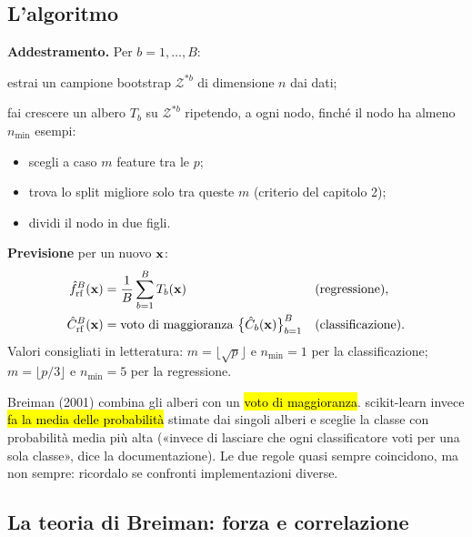 \subsection{L'algoritmo}

\begin{tecnica}
\textbf{Addestramento.} Per $b=1,\dots,B$:
\begin{passi}
  \item estrai un campione bootstrap $\mathcal{Z}^{*b}$ di dimensione $n$ dai dati;
  \item fai crescere un albero $T_b$ su $\mathcal{Z}^{*b}$ ripetendo, a ogni nodo, finché il nodo ha almeno $n_{\min}$ esempi:
    \begin{itemize}
      \item scegli a caso $m$ feature tra le $p$;
      \item trova lo split migliore solo tra queste $m$ (criterio del capitolo 2);
      \item dividi il nodo in due figli.
    \end{itemize}
\end{passi}
\textbf{Previsione} per un nuovo $\mathbf{x}$:
\begin{align*}
\hat f_{\mathrm{rf}}^{B}(\mathbf{x})&=\frac1B\sum_{b=1}^{B}T_b(\mathbf{x}) &&\text{(regressione)},\\
\hat C_{\mathrm{rf}}^{B}(\mathbf{x})&=\text{voto di maggioranza}\ \big\{\hat C_b(\mathbf{x})\big\}_{b=1}^{B} &&\text{(classificazione)}.
\end{align*}
Valori consigliati in letteratura: $m=\lfloor\sqrt p\rfloor$ e $n_{\min}=1$ per la classificazione; $m=\lfloor p/3\rfloor$ e $n_{\min}=5$ per la regressione.
\end{tecnica}

\begin{attenzione}
Breiman (2001) combina gli alberi con un \hl{voto di maggioranza}. scikit-learn invece \hl{fa la media delle probabilità} stimate dai singoli alberi e sceglie la classe con probabilità media più alta («invece di lasciare che ogni classificatore voti per una sola classe», dice la documentazione). Le due regole quasi sempre coincidono, ma non sempre: ricordalo se confronti implementazioni diverse.
\end{attenzione}

\subsection{La teoria di Breiman: forza e correlazione}

